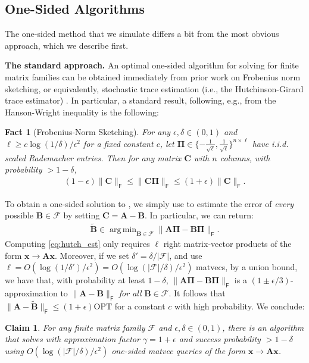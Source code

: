 \documentclass{article}[11pt]
\newtheorem{claim}{Claim}
\newtheorem{fact}{Fact}
\theoremstyle{definition}
\newcommand{\bv}[1]{\boldsymbol{\mathbf{#1}}}
\newcommand{\Fro}{\mathsf{F}}
\newcommand{\F}{\mathcal{F}}
\newcommand{\OPT}{\mathrm{OPT}}
\DeclareMathOperator*{\argmin}{arg\,min}
\begin{document}
    \subsection{One-Sided Algorithms}
    \label{sec:one_sided}
The one-sided method that we simulate differs a bit from the most obvious approach, which we describe first.

    \smallskip \noindent\textbf{The standard approach.}
    An optimal one-sided algorithm for solving  for finite matrix families can be obtained immediately from prior work on Frobenius norm sketching, or equivalently, stochastic trace estimation (i.e., the Hutchinson-Girard trace estimator) \cite{Hutchinson:1990,Girard:1987,ClarksonWoodruff:2009,AvronToledo:2011,rudelson2013hanson,Roosta-KhorasaniAscher:2015,CortinovisKressner:2022}. In particular, a standard result, following, e.g., from the Hanson-Wright inequality \cite{rudelson2013hanson} is the following:
    \begin{fact}[Frobenius-Norm Sketching]\label{fact:hutch_standard} For any $\epsilon,\delta \in (0,1)$ and  $\ell \geq c\log(1/\delta)/\epsilon^2$  for a fixed constant $c$, let $\bv{\Pi} \in \{-\frac{1}{\sqrt{\ell}},\frac{1}{\sqrt{\ell}}\}^{n\times \ell}$ have i.i.d. scaled Rademacher entries. Then for any matrix $\bv{C}$ with $n$ columns, with probability $> 1-\delta$, 
    \begin{align}
        \label{eq:hutch_standard}
    (1-\epsilon)\|\bv{C}\|_\Fro \leq \|\bv{C}\bv{\Pi}\|_\Fro \leq (1+\epsilon)\|\bv{C}\|_\Fro.
    \end{align}
    \end{fact} 
    To obtain a one-sided solution to , we simply use  to estimate the error of \emph{every} possible $\bv{B} \in \F$ by setting $\bv{C} = \bv{A} - \bv{B}$. In particular, we can return:
    \begin{align}
        \label{eq:hutch_est}
    \bv{\tilde B} \in \argmin_{\bv{B}\in \F}\|\bv{A}\bv{\Pi}- \bv{B}\bv{\Pi}\|_\Fro. 
    \end{align}
    Computing \eqref{eq:hutch_est} only requires $\ell$ right matrix-vector products of the form $\bv x \rightarrow \bv{Ax}$. Moreover, if we set $\delta' =\delta/|\mathcal{F}|$, and use $\ell = O(\log(1/\delta')/\epsilon^2) = O(\log(|\F|/\delta)/\epsilon^2)$ matvecs, by a union bound, we have that, with probability at least $1-\delta$, $\|\bv{A}\bv{\Pi}- \bv{B}\bv{\Pi}\|_\Fro$ is a $(1\pm\epsilon/3)$-approximation to $\|\bv{A} - \bv{B}\|_\Fro$ \emph{for all} $\bv{B} \in \F$. It follows that $\|\bv{A} - \bv{\tilde B}\|_\Fro \leq (1+\epsilon)\OPT$ for a constant $c$ with high probability. 
    We conclude:
    \begin{claim}
    \label{clm:one_sided_hutch} 
    For any finite matrix family $\mathcal{F}$ and $\epsilon,\delta \in (0,1)$, there is an algorithm that solves  with approximation factor $\gamma = 1+\epsilon$ and success probability $> 1-\delta$ using $O(\log (|\F|/\delta)/\epsilon^2)$ one-sided matvec queries of the form $\bv x \rightarrow \bv{A}\bv x$. 
    \end{claim}
\end{document}
